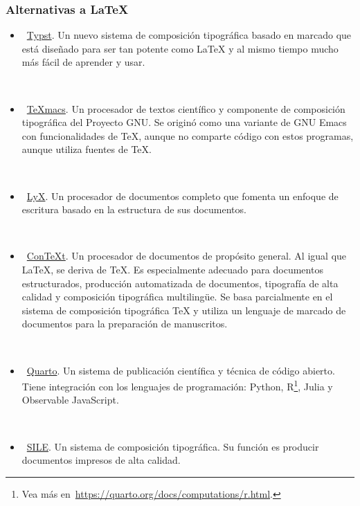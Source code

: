 \begin{frame}
	\frametitle{Alternativas a \LaTeX}

	\begin{itemize}[<+->]
		\item

		      ~\href{https://github.com/typst/typst}{Typst}.
		      Un nuevo sistema de composición tipográfica basado en
		      marcado que está diseñado para ser tan potente como
		      \LaTeX{} y al mismo tiempo mucho más fácil de aprender y
		      usar.

		      \

		\item

		      ~\href{https://github.com/texmacs/texmacs}{\TeX{}macs}.
		      Un procesador de textos científico y componente de
		      composición tipográfica del Proyecto GNU.
		      Se originó como una variante de GNU Emacs con
		      funcionalidades de \TeX, aunque no comparte código con
		      estos programas, aunque utiliza fuentes de \TeX.

		      \

		\item

		      ~\href{https://www.lyx.org}{LyX}.
		      Un procesador de documentos completo que fomenta un
		      enfoque de escritura basado en la estructura de sus
					documentos.

		      \

		\item

		      \textcolor{cyan}{}~\href{https://wiki.contextgarden.net}{Con\TeX{}t}. %
		      Un procesador de documentos de propósito general.
		      Al igual que \LaTeX, se deriva de \TeX.
		      Es especialmente adecuado para documentos
		      estructurados, producción automatizada de
		      documentos, tipografía de alta calidad y
		      composición tipográfica multilingüe.
		      Se basa parcialmente en el sistema de composición
		      tipográfica \TeX{} y utiliza un lenguaje de marcado
		      de documentos para la preparación de manuscritos.

		      \

		\item

		      ~\href{https://quarto.org}{Quarto}.
		      Un sistema de publicación científica y técnica de código
		      abierto.
		      Tiene integración con los lenguajes de programación:
		      Python, R\footnote{Vea más en~\url{https://quarto.org/docs/computations/r.html}.},
		      Julia y Observable JavaScript.

		      \

		\item

		      ~\href{https://sile-typesetter.org}{SILE}.
		      Un sistema de composición tipográfica.
		      Su función es producir documentos impresos de alta calidad.
	\end{itemize}
\end{frame}
